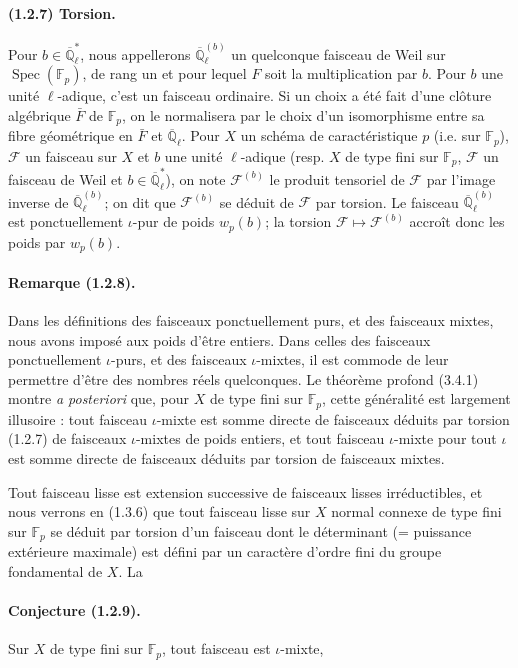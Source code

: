 \documentclass[11pt]{article}
\theoremstyle{remark}
\newcommand{\Qlb}{\overline{\mathbb{Q}}_\ell}
\newcommand{\Fp}{\mathbb{F}_p}
\newcommand{\Spec}{\operatorname{Spec}}
\begin{document}
\paragraph{(1.2.7) Torsion.} Pour $b\in\Qlb^*$, nous appellerons $\Qlb^{(b)}$ un quelconque faisceau de Weil sur $\Spec(\Fp)$, de rang un et pour lequel $F$ soit la multiplication par $b$. Pour $b$ une unité $\ell$-adique, c'est un faisceau ordinaire. Si un choix a été fait d'une clôture algébrique $\bar F$ de $\Fp$, on le normalisera par le choix d'un isomorphisme entre sa fibre géométrique en $\bar F$ et $\Qlb$. Pour $X$ un schéma de caractéristique $p$ (i.e. sur $\Fp$), $\mathcal F$ un faisceau sur $X$ et $b$ une unité $\ell$-adique (resp. $X$ de type fini sur $\Fp$, $\mathcal F$ un faisceau de Weil et $b\in\Qlb^*$), on note $\mathcal F^{(b)}$ le produit tensoriel de $\mathcal F$ par l'image inverse de $\Qlb^{(b)}$; on dit que $\mathcal F^{(b)}$ se déduit de $\mathcal F$ par torsion. Le faisceau $\Qlb^{(b)}$ est ponctuellement $\iota$-pur de poids $w_p(b)$; la torsion $\mathcal F\mapsto\mathcal F^{(b)}$ accroît donc les poids par $w_p(b)$.

\paragraph{Remarque (1.2.8).} Dans les définitions des faisceaux ponctuellement purs, et des faisceaux mixtes, nous avons imposé aux poids d'être entiers. Dans celles des faisceaux ponctuellement $\iota$-purs, et des faisceaux $\iota$-mixtes, il est commode de leur permettre d'être des nombres réels quelconques. Le théorème profond (3.4.1) montre \emph{a posteriori} que, pour $X$ de type fini sur $\Fp$, cette généralité est largement illusoire : tout faisceau $\iota$-mixte est somme directe de faisceaux déduits par torsion (1.2.7) de faisceaux $\iota$-mixtes de poids entiers, et tout faisceau $\iota$-mixte pour tout $\iota$ est somme directe de faisceaux déduits par torsion de faisceaux mixtes.

Tout faisceau lisse est extension successive de faisceaux lisses irréductibles, et nous verrons en (1.3.6) que tout faisceau lisse sur $X$ normal connexe de type fini sur $\Fp$ se déduit par torsion d'un faisceau dont le déterminant (= puissance extérieure maximale) est défini par un caractère d'ordre fini du groupe fondamental de $X$. La

\paragraph{Conjecture (1.2.9).} Sur $X$ de type fini sur $\Fp$, tout faisceau est $\iota$-mixte,
\end{document}
